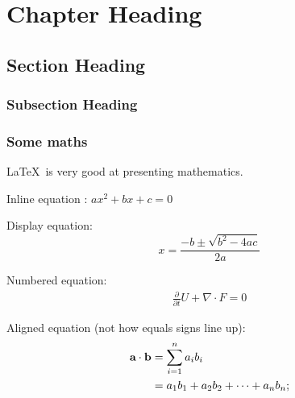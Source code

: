 \chapter{Chapter Heading} %
\label{cha:chapter label} %

\blindtext[1] %
\blindtext[2] %

\section{Section Heading} %
\label{sec:section label} %

\blindtext[1]
 
\subsection{Subsection Heading} %
\label{sec:subsection label} %

\blindtext[1]

\subsection{Some maths}


\LaTeX\ is very good at presenting mathematics.

Inline equation :
$ax^2 + bx + c = 0$ %

Display equation:
$$x = \frac{-b \pm \sqrt{b^2 - 4ac}}{2a}$$ %

Numbered equation:
\begin{align}
	\label{eq:equation label} %
	\frac{\partial}{\partial t} U + \nabla \cdot F = 0
\end{align}

Aligned equation (not how equals signs line up):
\begin{align}
	\notag %
	\label{eq:dot product}
	\textbf{a} \cdot \textbf{b} &= \sum_{i=1}^n a_ib_i \\
	&= a_1b_1 + a_2b_2 + \cdots + a_nb_n; %
\end{align}

